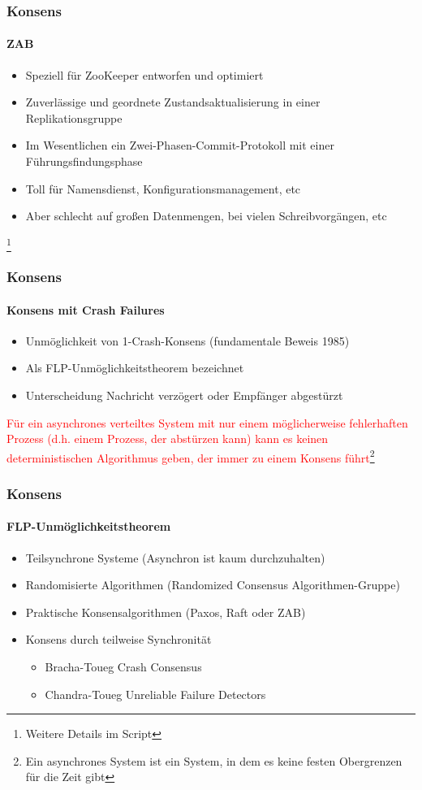\begin{frame}
  \frametitle{Konsens}
  \framesubtitle{ZAB}
  \begin{itemize}
    \item Speziell für ZooKeeper entworfen und optimiert
    \item Zuverlässige und geordnete Zustandsaktualisierung in einer Replikationsgruppe
    \item Im Wesentlichen ein Zwei-Phasen-Commit-Protokoll mit einer Führungsfindungsphase
    \item Toll für Namensdienst, Konfigurationsmanagement, etc
    \item Aber schlecht auf großen Datenmengen, bei vielen Schreibvorgängen, etc 
  \end{itemize}
    \footnote{Weitere Details im Script}
\end{frame}


\begin{frame}
  \frametitle{Konsens}
  \framesubtitle{Konsens mit Crash Failures}
  \begin{itemize}
    \item Unmöglichkeit von 1-Crash-Konsens (fundamentale Beweis 1985)
    \item Als FLP-Unmöglichkeitstheorem bezeichnet
    \item Unterscheidung Nachricht verzögert oder Empfänger abgestürzt
  \end{itemize}
  \textcolor{red}{Für ein asynchrones verteiltes System mit nur einem möglicherweise fehlerhaften Prozess (d.h. einem Prozess, der abstürzen kann) kann es keinen deterministischen Algorithmus geben, der immer zu einem Konsens führt}\footnote{Ein asynchrones System ist ein System, in dem es keine festen Obergrenzen für die Zeit gibt}
\end{frame}

\begin{frame}
  \frametitle{Konsens}
  \framesubtitle{FLP-Unmöglichkeitstheorem}
  \begin{itemize}
    \item Teilsynchrone Systeme (Asynchron ist kaum durchzuhalten)
    \item Randomisierte Algorithmen (Randomized Consensus Algorithmen-Gruppe)
    \item Praktische Konsensalgorithmen (Paxos, Raft oder ZAB)
    \item Konsens durch teilweise Synchronität
    \begin{itemize}
      \item Bracha-Toueg Crash Consensus
      \item Chandra-Toueg Unreliable Failure Detectors 
    \end{itemize}
  \end{itemize}
\end{frame}


